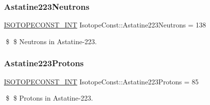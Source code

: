 \subsubsection{\texorpdfstring{Astatine223\+Neutrons}{Astatine223Neutrons}}
{\footnotesize\ttfamily \mbox{\hyperlink{group___isotope_const-_macros_ga5f18360b3e99483a35c32d789e62621c}{I\+S\+O\+T\+O\+P\+E\+C\+O\+N\+S\+T\+\_\+\+I\+NT}} Isotope\+Const\+::\+Astatine223\+Neutrons = 138}

\$ \$ Neutrons in Astatine-\/223. \mbox{\label{group___isotope_const-_astatine-_at223_gaad5863b3c6cb8bfeb4bd1a6c80d9b9c8}} 
\subsubsection{\texorpdfstring{Astatine223\+Protons}{Astatine223Protons}}
{\footnotesize\ttfamily \mbox{\hyperlink{group___isotope_const-_macros_ga5f18360b3e99483a35c32d789e62621c}{I\+S\+O\+T\+O\+P\+E\+C\+O\+N\+S\+T\+\_\+\+I\+NT}} Isotope\+Const\+::\+Astatine223\+Protons = 85}

\$ \$ Protons in Astatine-\/223. 